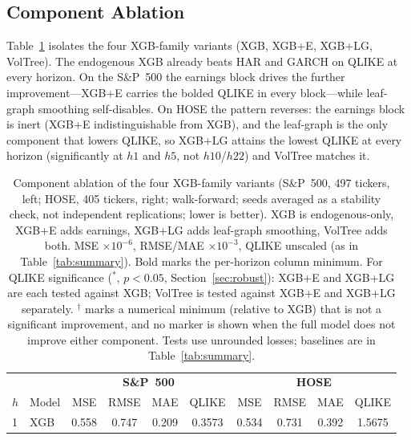 \documentclass[runningheads,a4paper]{llncs}
\begin{document}
\subsection{Component Ablation}
Table~\ref{tab:detail} isolates the four XGB-family variants (XGB, XGB+E, XGB+LG, VolTree). The endogenous
XGB already beats HAR and GARCH on QLIKE at every horizon. On the S\&P~500 the earnings block drives the
further improvement---XGB+E carries the bolded QLIKE in every block---while leaf-graph smoothing
self-disables. On HOSE the pattern reverses: the earnings block is inert (XGB+E indistinguishable from
XGB), and the leaf-graph is the only component that lowers QLIKE, so XGB+LG attains the lowest QLIKE at
every horizon (significantly at $h1$ and $h5$, not $h10$/$h22$) and VolTree matches it.

\begin{table}[t]
\centering
\caption{Component ablation of the four XGB-family variants (S\&P~500, 497 tickers, left; HOSE, 405
tickers, right; walk-forward; seeds averaged as a stability check, not independent replications; lower is
better). XGB is endogenous-only, XGB+E adds earnings, XGB+LG adds leaf-graph smoothing, VolTree adds both.
MSE $\times10^{-6}$, RMSE/MAE $\times10^{-3}$, QLIKE unscaled (as in Table~\ref{tab:summary}). Bold marks
the per-horizon column minimum. For QLIKE significance ($^{*}$, $p<0.05$, Section~\ref{sec:robust}): XGB+E
and XGB+LG are each tested against XGB; VolTree is tested against XGB+E and XGB+LG separately. $^{\dagger}$
marks a numerical minimum (relative to XGB) that is not a significant improvement, and no marker is shown
when the full model does not improve either component. Tests use unrounded losses; baselines are in
Table~\ref{tab:summary}.}
\label{tab:detail}
\scriptsize
\setlength{\tabcolsep}{3pt}
\begin{tabular}{ll cccc cccc}
\toprule
& & \multicolumn{4}{c}{\textbf{S\&P~500}} & \multicolumn{4}{c}{\textbf{HOSE}} \\
\cmidrule(lr){3-6}\cmidrule(lr){7-10}
$h$ & Model & MSE & RMSE & MAE & QLIKE & MSE & RMSE & MAE & QLIKE \\
\midrule
1 & XGB      & 0.558 & 0.747 & 0.209 & 0.3573 & 0.534 & 0.731 & 0.392 & 1.5675 \\

\end{tabular}
\end{table}
\end{document}
